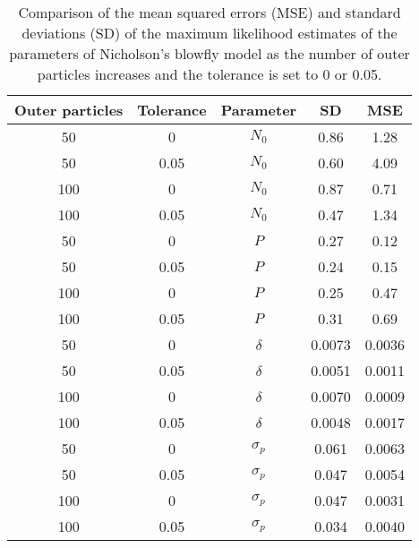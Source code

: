 \documentclass[12pt]{article}
\newcommand{\ra}[1]{\renewcommand{\arraystretch}{#1}}
\begin{document}
	\begin{table}[htb]
		\centering
		\ra{1.3}
		\begin{tabular}{@{}ccccc@{}} \toprule
			Outer particles & Tolerance & Parameter &  SD & MSE \\ \midrule 
			50 & 0 & $N_0$ & 0.86 & 1.28 \\ 
			50 & 0.05 & $N_0$ & 0.60 &  4.09  \\ 
			100 & 0 & $N_0$ & 0.87 & 0.71  \\
			100 & 0.05 & $N_0$ & 0.47 & 1.34 \\
			50 & 0 & $P$ & 0.27 & 0.12 \\ 
			50 & 0.05 & $P$ & 0.24 &  0.15  \\ 
			100 & 0 & $P$ & 0.25 & 0.47  \\
			100 & 0.05 & $P$ & 0.31 & 0.69 \\
			50 & 0 & $\delta$ & 0.0073 & 0.0036 \\ 
			50 & 0.05 & $\delta$ & 0.0051 &  0.0011  \\ 
			100 & 0 & $\delta$ & 0.0070 & 0.0009  \\
			100 & 0.05 & $\delta$ & 0.0048 & 0.0017 \\
			50 & 0 & $\sigma_p$ & 0.061 &  0.0063 \\ 
			50 & 0.05 & $\sigma_p$ &  0.047 &  0.0054  \\ 
			100 & 0 & $\sigma_p$ & 0.047 & 0.0031  \\
			100 & 0.05 & $\sigma_p$ &  0.034 & 0.0040 \\\bottomrule
		\end{tabular}
		\caption{Comparison of the mean squared errors (MSE) and standard deviations (SD) of the maximum likelihood estimates of the parameters of Nicholson's blowfly model as the number of outer particles increases and the tolerance is set to 0 or 0.05.}
		\label{table:mleBlow}
	\end{table}
\clearpage

	
	{}
	
\end{document}
